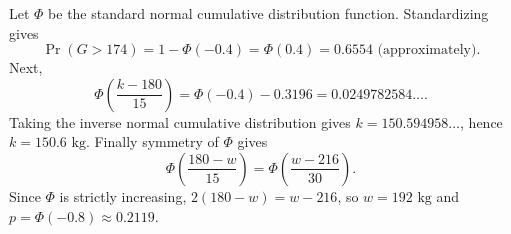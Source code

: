 Let $\Phi$ be the standard normal cumulative distribution function. Standardizing gives
\[
\Pr(G>174)=1-\Phi(-0.4)=\Phi(0.4)=\boxed{0.6554\text{ (approximately)}}.
\]
Next,
\[
\Phi\left(\dfrac{k-180}{15}\right)=\Phi(-0.4)-0.3196=0.0249782584\ldots.
\]
Taking the inverse normal cumulative distribution gives $k=150.594958\ldots$, hence $\boxed{k=150.6\text{ kg}}$.
Finally symmetry of $\Phi$ gives
\[
\Phi\left(\dfrac{180-w}{15}\right)=\Phi\left(\dfrac{w-216}{30}\right).
\]
Since $\Phi$ is strictly increasing, $2(180-w)=w-216$, so $\boxed{w=192\text{ kg}}$ and $\boxed{p=\Phi(-0.8)\approx0.2119}$.
